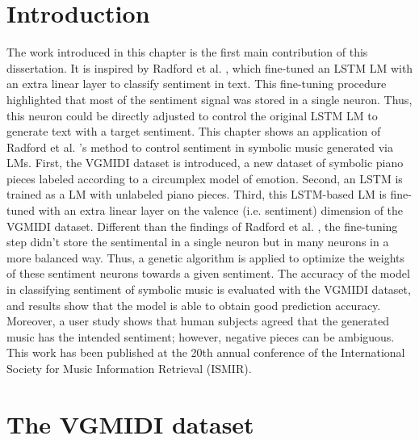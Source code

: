\section{Introduction}

The work introduced in this chapter is the first main contribution of this dissertation. It is inspired by Radford et al. \cite{radford_2017}, which fine-tuned an LSTM LM with an extra linear layer to classify sentiment in text. This fine-tuning procedure highlighted that most of the sentiment signal was stored in a single neuron. Thus, this neuron could be directly adjusted to control the original LSTM LM to generate text with a target sentiment. This chapter shows an application of Radford et al. \cite{radford_2017}'s method to control sentiment in symbolic music generated via LMs. First, the VGMIDI dataset is introduced, a new dataset of symbolic piano pieces labeled according to a circumplex model of emotion. Second, an LSTM is trained as a LM with unlabeled piano pieces. Third, this LSTM-based LM is fine-tuned with an extra linear layer on the valence (i.e. sentiment) dimension of the VGMIDI dataset. Different than the findings of Radford et al. \cite{radford_2017}, the fine-tuning step didn't store the sentimental in a single neuron but in many neurons in a more balanced way. Thus, a genetic algorithm is applied to optimize the weights of these sentiment neurons towards a given sentiment. The accuracy of the model in classifying sentiment of symbolic music is evaluated with the VGMIDI dataset, and results show that the model is able to obtain good prediction accuracy. Moreover, a user study shows that human subjects agreed that the generated music has the intended sentiment; however, negative pieces can be ambiguous. This work has been published at the 20th annual conference of the International Society for Music Information Retrieval (ISMIR).

\section{The VGMIDI dataset}

